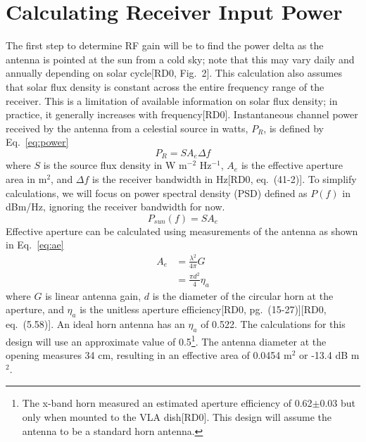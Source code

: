 \documentclass[titlepage]{article}
\newcommand{\nraocite}[1]{[RD0\cite{#1}]}
\newcommand{\nraoprecite}[2][]{[RD0\cite{#2}{, #1}]}
\begin{document}
\section{Calculating Receiver Input Power}
The first step to determine RF gain will be to find the power delta as the antenna is pointed at the sun from a cold sky; note that this may vary daily and annually depending on solar cycle\nraoprecite[Fig.~2]{solartemp}. This calculation also assumes that solar flux density is constant across the entire frequency range of the receiver. This is a limitation of available information on solar flux density; in practice, it generally increases with frequency\nraocite{sfd1986}. Instantaneous channel power received by the antenna from a celestial source in watts, $P_R$, is defined by Eq.~\ref{eq:power}
\begin{equation}
    P_R = S A_e \Delta f
\label{eq:power}
\end{equation}
where $S$ is the source flux density in W m$^{-2}$ Hz$^{-1}$, $A_e$ is the effective aperture area in m$^2$, and $\Delta f$ is the receiver bandwidth in Hz\nraoprecite[eq.~(41-2)]{aeh}. To simplify calculations, we will focus on power spectral density (PSD) defined as $P(f)$ in dBm/Hz, ignoring the receiver bandwidth for now.
\begin{equation}
    P_{sun}(f) = S A_e
\label{eq:psd}
\end{equation}
Effective aperture can be calculated using measurements of the antenna as shown in Eq.~\ref{eq:ae}
\begin{equation} \label{eq:ae}
\begin{split}
    A_e &= \frac{\lambda^2}{4\pi}G \\
    &= \frac{\pi d^2}{4} \eta_a
\end{split}
\end{equation}
where $G$ is linear antenna gain, $d$ is the diameter of the circular horn at the aperture, and $\eta_a$ is the unitless aperture efficiency\nraoprecite[pg.~(15-27)]{aeh}\nraoprecite[eq.~(5.58)]{tora}. An ideal horn antenna has an $\eta_a$ of 0.522. The calculations for this design will use an approximate value of 0.5\footnote{The x-band horn measured an estimated aperture efficiency of 0.62$\pm$0.03 but only when mounted to the VLA dish\nraocite{xbandvla}. This design will assume the antenna to be a standard horn antenna.}. The antenna diameter at the opening measures 34 cm, resulting in an effective area of 0.0454 m$^2$ or -13.4 dB m$^2$.
\end{document}
